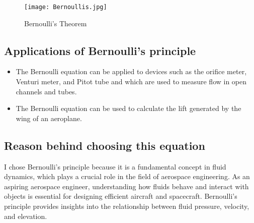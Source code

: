 \documentclass{article}
\begin{document}
\begin{figure}[H]
    \centering
    \texttt{[image: Bernoullis.jpg]}
    \caption{Bernoulli's Theorem}
\end{figure}
\subsection*{Applications of Bernoulli's principle}
\begin{itemize}
  \item The Bernoulli equation can be applied to devices such as the orifice meter, Venturi meter, and Pitot tube and which are used to measure flow in open channels and tubes.
  \item The Bernoulli equation can be used to calculate the lift generated by the wing of an aeroplane.\\
\end{itemize}

\subsection*{Reason behind choosing this equation}
I chose Bernoulli's principle because it is a fundamental concept in fluid dynamics, which plays a crucial role in the field of aerospace engineering. As an aspiring aerospace engineer, understanding how fluids behave and interact with objects is essential for designing efficient aircraft and spacecraft. Bernoulli's principle provides insights into the relationship between fluid pressure, velocity, and elevation.



\end{document}

